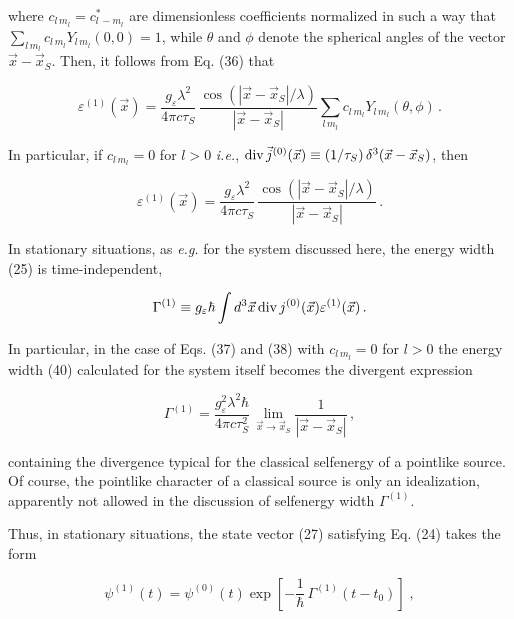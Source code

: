 \documentclass[a4paper,12pt]{article}
\begin{document}
\ni where $c_{l\, m_l} = c^*_{l\, -m_l}$ are dimensionless coefficients normalized in such a way that $\sum_{l\, m_l} c_{l\, m_l} Y_{l\, m_l}(0,0) =1$, while $\theta$ and $\phi$ denote the spherical angles of the vector $\vec{x}-\vec{x}_S$. Then, it follows from Eq. (36) that

\begin{equation}
\varepsilon^{(1)}(\vec{x}) = \frac{g_\varepsilon \lambda^2}{4\pi c \tau_S}\, \frac{\cos (|\vec{x}-\vec{x}_S| /\lambda)}{|\vec{x}-\vec{x}_S|}\sum_{l\, m_l} c_{l\, m_l} Y_{l\,m_l}(\theta,\phi)\,.
\end{equation}

\ni In particular, if $c_{l\, m_l} = 0$ for $l>0$ {\it i.e.}, ${\rm div}\, \vec{j}^{(0)}(\vec{x}) \equiv (1/\tau_S) \, \delta^3(\vec{x}-\vec{x}_S)$, then

\begin{equation}
\varepsilon^{(1)}(\vec{x}) = \frac{g_\varepsilon \lambda^2}{4\pi c \tau_S}\, \frac{\cos (|\vec{x}-\vec{x}_S| /\lambda)}{|\vec{x}-\vec{x}_S|}\,.
\end{equation}

In stationary situations, as {\it e.g.} for the system discussed here, the energy width (25) is time-independent,

\begin{equation}
\Gamma^{(1)} \equiv g_\varepsilon \hbar \int d^3\vec{x}\,{\rm div}\, j^{(0)}(\vec{x}) \varepsilon^{ (1)}(\vec{x}) \,.
\end{equation}

\ni In particular, in the case of Eqs. (37) and (38) with $c_{l\, m_l} = 0$ for $l>0$ the energy width (40) calculated for the system itself becomes the divergent expression

\begin{equation}
\Gamma^{(1)} = \frac{g^2_\varepsilon \lambda^2 \hbar}{4\pi c \tau_S^2}\, \lim_{\vec{x} \rightarrow \vec{x}_S} \frac{1}{|\vec{x}-\vec{x}_S|} \,,
\end{equation}

\ni containing the divergence typical for the classical selfenergy of a pointlike source. Of course, the pointlike character of a classical source is only an idealization, apparently not allowed in the discussion of selfenergy width $\Gamma^{(1)}$.

Thus, in stationary situations, the state vector (27) satisfying Eq. (24) takes the form

\begin{equation}
\psi^{(1)}(t) = \psi^{(0)}(t) \exp\left[ -\frac{1}{\hbar}\, \Gamma^{(1)}(t - t_0)\right] \;,
\end{equation}
\end{document}
